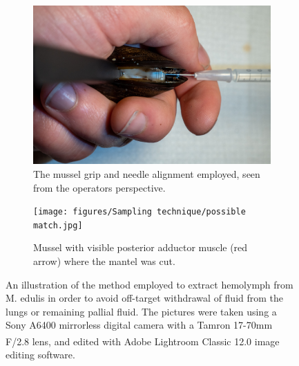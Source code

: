 \begin{figure}
\begin{subfigure}[b]{.45\textwidth}
        \centering
        \includegraphics[width=\textwidth]{figures/Sampling technique/hands colors centered.jpg}
        \caption{The mussel grip and needle alignment employed, seen from the operators perspective. }
        \label{sfig:c}
    \end{subfigure}
    \hfill
    \begin{subfigure}[b]{.45\textwidth}
        \centering
        \texttt{[image: figures/Sampling technique/possible match.jpg]}
        \caption{Mussel with visible posterior adductor muscle (red arrow) where the mantel was cut.}
        \label{sfig:d}
    \end{subfigure}
    \caption{An illustration of the method employed to extract hemolymph from M. edulis in order to avoid off-target withdrawal of fluid from the lungs or remaining pallial fluid. The pictures were taken using a Sony A6400 mirrorless digital camera with a Tamron 17-70mm F/2.8 lens, and edited with Adobe\textsuperscript{\textregistered} Lightroom Classic 12.0 image editing software.}
    \label{fig:Hemolymph_sampling_illustration}
\end{figure}

